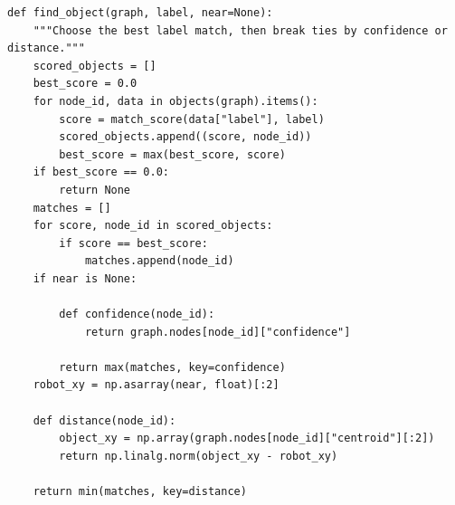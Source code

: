 \documentclass[11pt,a4paper]{book}
\begin{document}
\begin{lstlisting}[firstnumber=122]
def find_object(graph, label, near=None):
    """Choose the best label match, then break ties by confidence or distance."""
    scored_objects = []
    best_score = 0.0
    for node_id, data in objects(graph).items():
        score = match_score(data["label"], label)
        scored_objects.append((score, node_id))
        best_score = max(best_score, score)
    if best_score == 0.0:
        return None
    matches = []
    for score, node_id in scored_objects:
        if score == best_score:
            matches.append(node_id)
    if near is None:

        def confidence(node_id):
            return graph.nodes[node_id]["confidence"]

        return max(matches, key=confidence)
    robot_xy = np.asarray(near, float)[:2]

    def distance(node_id):
        object_xy = np.array(graph.nodes[node_id]["centroid"][:2])
        return np.linalg.norm(object_xy - robot_xy)

    return min(matches, key=distance)


\end{lstlisting}
\end{document}
